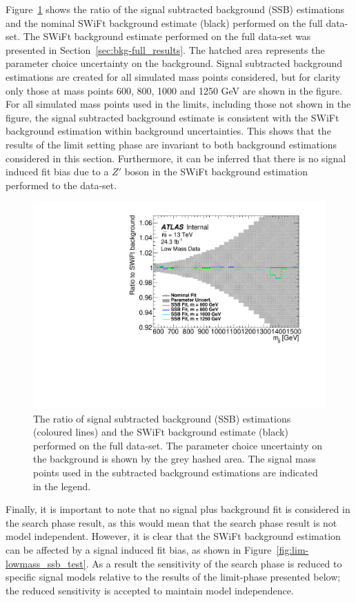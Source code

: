 Figure~\ref{fig:lim-lowmass_ssb_data} shows the ratio of the 
signal subtracted background (SSB) estimations and the nominal SWiFt background estimate (black) performed on the full \lm{} data-set.
The SWiFt background estimate performed on the full data-set was presented in Section~\ref{sec:bkg-full_results}.
The hatched area represents the parameter choice uncertainty on the background.
Signal subtracted background estimations are created for all simulated mass points considered,
but for clarity only those at mass points 600, 800, 1000 and 1250 GeV are shown in the figure.
For all simulated mass points used in the limits, including those not shown in the figure,
the signal subtracted background estimate is consistent with the SWiFt background estimation
within background uncertainties.
This shows that the results of the limit setting phase are invariant to both background estimations considered in this section.
Furthermore, it can be inferred that there is no signal induced fit bias due to a $Z'$ boson
in the SWiFt background estimation performed to the \lm{} data-set.

\begin{figure}[!ht]
  \begin{center}
    \includegraphics[width=0.6\linewidth, angle=0]{figs/Dibjet/LowMass/lim-ssb_data.pdf}
  \end{center}
  \vspace{-1mm}
  \caption{The ratio of signal subtracted background (SSB) estimations (coloured lines)
    and the SWiFt background estimate (black) performed on the full \lm{} data-set.
    The parameter choice uncertainty on the background is shown by the grey hashed area.
    The signal mass points used in the subtracted background estimations are indicated in the legend.}
  \label{fig:lim-lowmass_ssb_data}
\end{figure}

Finally, it is important to note that no signal plus background fit is considered in the search phase result,
as this would mean that the search phase result is not model independent.
However, it is clear that the SWiFt background estimation can be affected by a signal induced fit bias,
as shown in Figure~\ref{fig:lim-lowmass_ssb_test}.
As a result the sensitivity of the search phase is reduced to specific signal models relative to the results of the limit-phase presented below;
the reduced sensitivity is accepted to maintain model independence.

